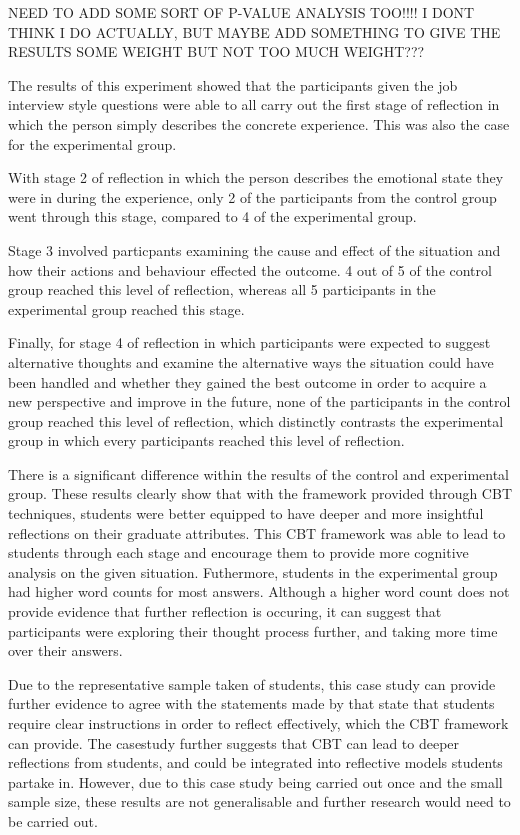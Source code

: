 \documentclass{l4proj}
\begin{document}
NEED TO ADD SOME SORT OF P-VALUE ANALYSIS TOO!!!! I DONT THINK I DO ACTUALLY, BUT MAYBE ADD SOMETHING TO GIVE THE RESULTS SOME WEIGHT BUT NOT TOO MUCH WEIGHT???

The results of this experiment showed that the participants given the job interview style questions were able to all carry out the first stage of reflection in which the person simply describes the concrete experience. This was also the case for the experimental group. 

With stage 2 of reflection in which the person describes the emotional state they were in during the experience, only 2 of the participants from the control group went through this stage, compared to 4 of the experimental group.

Stage 3 involved particpants examining the cause and effect of the situation and how their actions and behaviour effected the outcome. 4 out of 5 of the control group reached this level of reflection, whereas all 5 participants in the experimental group reached this stage.

Finally, for stage 4 of reflection in which participants were expected to suggest alternative thoughts and examine the alternative ways the situation could have been handled and whether they gained the best outcome in order to acquire a new perspective and improve in the future, none of the participants in the control group reached this level of reflection, which distinctly contrasts the experimental group in which every participants reached this level of reflection.


There is a significant difference within the results of the control and experimental group. These results clearly show that with the framework provided through CBT techniques, students were better equipped to have deeper and more insightful reflections on their graduate attributes. This CBT framework was able to lead to students through each stage and encourage them to provide more cognitive analysis on the given situation. Futhermore, students in the experimental group had higher word counts for most answers. Although a higher word count does not provide evidence that further reflection is occuring, it can suggest that participants were exploring their thought process further, and taking more time over their answers. 

Due to the representative sample taken of students, this case study can provide further evidence to agree with the statements made by \citet{bruno_reflective_2018} that state that students require clear instructions in order to reflect effectively, which the CBT framework can provide. The casestudy further suggests that CBT can lead to deeper reflections from students, and could be integrated into reflective models students partake in. However, due to this case study being carried out once and the small sample size, these results are not generalisable and further research would need to be carried out. 
\end{document}
